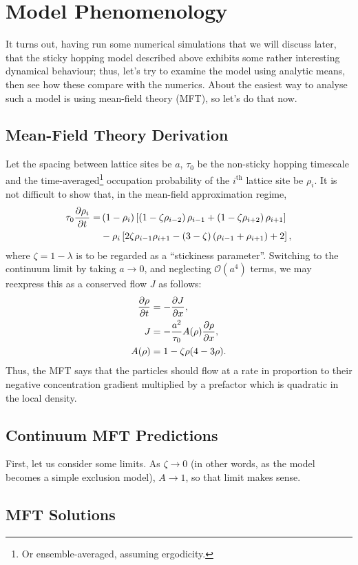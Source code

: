 \section{Model Phenomenology}
It turns out, having run some numerical simulations that we will discuss later, that the sticky hopping model described above exhibits some rather interesting dynamical behaviour; thus, let's try to examine the model using analytic means,
then see how these compare with the numerics. About the easiest way to analyse such a model is using mean-field theory (MFT), so let's do that now.
\subsection{Mean-Field Theory Derivation}
Let the spacing between lattice sites be $a$, $\tau_0$ be the non-sticky hopping timescale and the time-averaged\footnote{Or ensemble-averaged, assuming ergodicity.} occupation probability of the $i^{\mathrm{th}}$ lattice site be $\rho_i$. 
It is not difficult to show that, in the mean-field approximation regime,
\begin{align*}
 \tau_0 \frac{\partial \rho_i}{\partial t} = &\left( 1-\rho_i \right) \left[ \left(1-\zeta\rho_{i-2} \right) \rho_{i-1} + \left(1-\zeta\rho_{i+2} \right) \rho_{i+1} \right] \\
 &- \rho_i \left[ 2 \zeta \rho_{i-1} \rho_{i+1}  - (3-\zeta)\left(\rho_{i-1} + \rho_{i+1}\right) + 2 \right],\\
\end{align*}
where $\zeta = 1-\lambda$ is to be regarded as a ``stickiness parameter''. Switching to the continuum limit by taking $a\rightarrow 0$, and neglecting $\mathcal{O}(a^4)$ terms, we may reexpress this as a conserved flow $J$ as follows:
\begin{align*}
 \frac{\partial \rho}{\partial t} &= - \frac{\partial J}{\partial x}, \\
 J &= - \frac{a^2}{\tau_0} A(\rho) \frac{\partial \rho}{\partial x}, \\
 A(\rho) &= 1 - \zeta \rho(4-3\rho). \\
\end{align*}
Thus, the MFT says that the particles should flow at a rate in proportion to their negative concentration gradient multiplied by a prefactor which is quadratic in the local density.
\subsection{Continuum MFT Predictions}
First, let us consider some limits. As $\zeta \rightarrow 0$ (in other words, as the model becomes a simple exclusion model), $A \rightarrow 1$, so that limit makes sense.
\subsection{MFT Solutions}